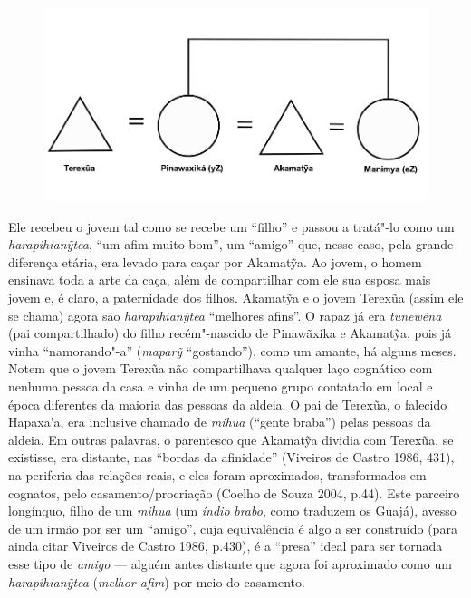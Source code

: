 \begin{figure}[H]
\centering
  \includegraphics[width=\textwidth]{./imgs/Figura_10}
\end{figure}


Ele recebeu o jovem tal como se recebe um ``filho'' e passou a tratá"-lo
como um \emph{harapihianỹtea}, ``um afim muito bom'', um ``amigo'' que,
nesse caso, pela grande diferença etária, era levado para caçar por
Akamatỹa. Ao jovem, o homem ensinava toda a arte da caça, além de
compartilhar com ele sua esposa mais jovem e, é claro, a paternidade dos
filhos. Akamatỹa e o jovem Terexũa (assim ele se chama) agora são
\emph{harapihianỹtea} ``melhores afins''. O rapaz já era \emph{tunewẽna}
(pai compartilhado) do filho recém"-nascido de Pinawãxika e Akamatỹa,
pois já vinha ``namorando"-a'' (\emph{maparỹ} ``gostando''), como um
amante, há alguns meses. Notem que o jovem Terexũa não compartilhava
qualquer laço cognático com nenhuma pessoa da casa e vinha de um pequeno
grupo contatado em local e época diferentes da maioria das pessoas da
aldeia. O pai de Terexũa, o falecido Hapaxa'a, era inclusive chamado de
\emph{mihua} (``gente braba'') pelas pessoas da aldeia. Em outras
palavras, o parentesco que Akamatỹa dividia com Terexũa, se existisse,
era distante, nas ``bordas da afinidade'' (Viveiros de Castro 1986,
431), na periferia das relações reais, e eles foram aproximados,
transformados em cognatos, pelo casamento/procriação (Coelho de Souza
2004, p.44). Este parceiro longínquo, filho de um \emph{mihua} (um
\emph{índio} \emph{brabo}, como traduzem os Guajá), avesso de um irmão
por ser um ``amigo'', cuja equivalência é algo a ser construído (para
ainda citar Viveiros de Castro 1986, p.430), é a ``presa'' ideal para
ser tornada esse tipo de \emph{amigo} --- alguém antes distante que agora
foi aproximado como um \emph{harapihianỹtea} (\emph{melhor afim}) por
meio do casamento.

